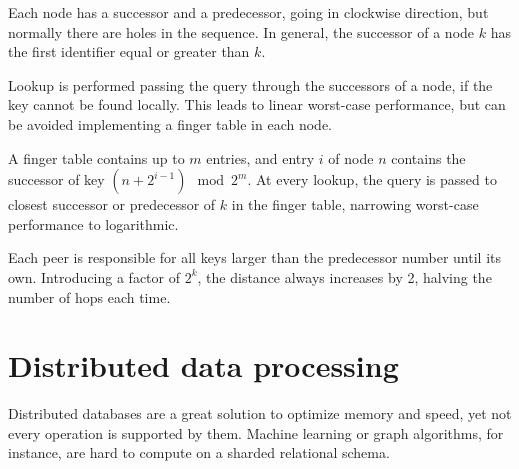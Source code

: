 Each node has a successor and a predecessor, going in clockwise direction, but normally there are holes in the sequence. In general, the successor of a node $k$ has the first identifier equal or greater than $k$.

Lookup is performed passing the query through the successors of a node, if the key cannot be found locally. This leads to linear worst-case performance, but can be avoided implementing a finger table in each node. 

A finger table contains up to $m$ entries, and entry $i$ of node $n$ contains the successor of key $(n + 2^{i-1}) \mod 2^m$. At every lookup, the query is passed to closest successor or predecessor of $k$ in the finger table, narrowing worst-case performance to logarithmic.

Each peer is responsible for all keys larger than the predecessor number until its own. Introducing a factor of $2^k$, the distance always increases by 2, halving the number of hops each time.

\section{Distributed data processing}
Distributed databases are a great solution to optimize memory and speed, yet not every operation is supported by them. Machine learning or graph algorithms, for instance, are hard to compute on a sharded relational schema.



